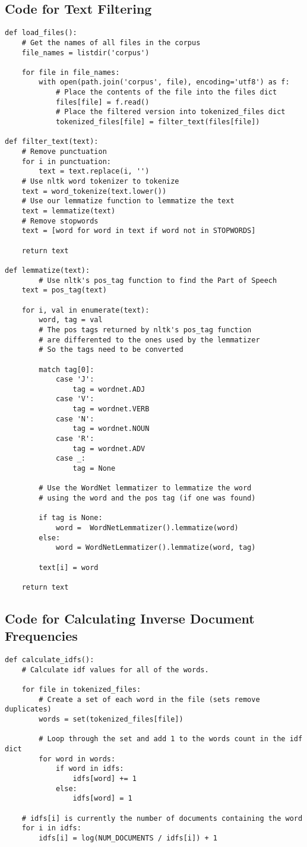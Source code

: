 \documentclass{article}
\begin{document}
\subsection{Code for Text Filtering}
\begin{verbatim}
def load_files():
    # Get the names of all files in the corpus
	file_names = listdir('corpus') 

	for file in file_names:
		with open(path.join('corpus', file), encoding='utf8') as f:
			# Place the contents of the file into the files dict
			files[file] = f.read() 
			# Place the filtered version into tokenized_files dict
			tokenized_files[file] = filter_text(files[file])

def filter_text(text):
	# Remove punctuation
	for i in punctuation:
		text = text.replace(i, '')
	# Use nltk word tokenizer to tokenize
	text = word_tokenize(text.lower()) 
	# Use our lemmatize function to lemmatize the text
	text = lemmatize(text) 
	# Remove stopwords
	text = [word for word in text if word not in STOPWORDS] 

	return text

def lemmatize(text):
        # Use nltk's pos_tag function to find the Part of Speech
	text = pos_tag(text) 
	
	for i, val in enumerate(text):
		word, tag = val
		# The pos tags returned by nltk's pos_tag function 
		# are differented to the ones used by the lemmatizer
		# So the tags need to be converted

		match tag[0]:
			case 'J':
				tag = wordnet.ADJ
			case 'V':
				tag = wordnet.VERB
			case 'N':
				tag = wordnet.NOUN
			case 'R':
				tag = wordnet.ADV
			case _:
				tag = None

		# Use the WordNet lemmatizer to lemmatize the word
		# using the word and the pos tag (if one was found)

		if tag is None:
			word =  WordNetLemmatizer().lemmatize(word)
		else:
			word = WordNetLemmatizer().lemmatize(word, tag)
		
		text[i] = word

	return text
\end{verbatim}

\subsection{Code for Calculating Inverse Document Frequencies}
\begin{verbatim}
def calculate_idfs():
	# Calculate idf values for all of the words.

	for file in tokenized_files:
		# Create a set of each word in the file (sets remove duplicates)
		words = set(tokenized_files[file])

		# Loop through the set and add 1 to the words count in the idf dict
		for word in words:
			if word in idfs:
				idfs[word] += 1
			else:
				idfs[word] = 1
	
	# idfs[i] is currently the number of documents containing the word
	for i in idfs:
		idfs[i] = log(NUM_DOCUMENTS / idfs[i]) + 1
\end{verbatim}
\end{document}
